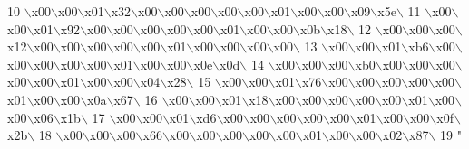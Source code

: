 \begin{DoxyCode}
10 \textcolor{stringliteral}{\(\backslash\)x00\(\backslash\)x00\(\backslash\)x01\(\backslash\)x32\(\backslash\)x00\(\backslash\)x00\(\backslash\)x00\(\backslash\)x00\(\backslash\)x00\(\backslash\)x01\(\backslash\)x00\(\backslash\)x00\(\backslash\)x09\(\backslash\)x5e\(\backslash\)}
11 \textcolor{stringliteral}{\(\backslash\)x00\(\backslash\)x00\(\backslash\)x01\(\backslash\)x92\(\backslash\)x00\(\backslash\)x00\(\backslash\)x00\(\backslash\)x00\(\backslash\)x00\(\backslash\)x01\(\backslash\)x00\(\backslash\)x00\(\backslash\)x0b\(\backslash\)x18\(\backslash\)}
12 \textcolor{stringliteral}{\(\backslash\)x00\(\backslash\)x00\(\backslash\)x00\(\backslash\)x12\(\backslash\)x00\(\backslash\)x00\(\backslash\)x00\(\backslash\)x00\(\backslash\)x00\(\backslash\)x01\(\backslash\)x00\(\backslash\)x00\(\backslash\)x00\(\backslash\)x00\(\backslash\)}
13 \textcolor{stringliteral}{\(\backslash\)x00\(\backslash\)x00\(\backslash\)x01\(\backslash\)xb6\(\backslash\)x00\(\backslash\)x00\(\backslash\)x00\(\backslash\)x00\(\backslash\)x00\(\backslash\)x01\(\backslash\)x00\(\backslash\)x00\(\backslash\)x0e\(\backslash\)x0d\(\backslash\)}
14 \textcolor{stringliteral}{\(\backslash\)x00\(\backslash\)x00\(\backslash\)x00\(\backslash\)xb0\(\backslash\)x00\(\backslash\)x00\(\backslash\)x00\(\backslash\)x00\(\backslash\)x00\(\backslash\)x01\(\backslash\)x00\(\backslash\)x00\(\backslash\)x04\(\backslash\)x28\(\backslash\)}
15 \textcolor{stringliteral}{\(\backslash\)x00\(\backslash\)x00\(\backslash\)x01\(\backslash\)x76\(\backslash\)x00\(\backslash\)x00\(\backslash\)x00\(\backslash\)x00\(\backslash\)x00\(\backslash\)x01\(\backslash\)x00\(\backslash\)x00\(\backslash\)x0a\(\backslash\)x67\(\backslash\)}
16 \textcolor{stringliteral}{\(\backslash\)x00\(\backslash\)x00\(\backslash\)x01\(\backslash\)x18\(\backslash\)x00\(\backslash\)x00\(\backslash\)x00\(\backslash\)x00\(\backslash\)x00\(\backslash\)x01\(\backslash\)x00\(\backslash\)x00\(\backslash\)x06\(\backslash\)x1b\(\backslash\)}
17 \textcolor{stringliteral}{\(\backslash\)x00\(\backslash\)x00\(\backslash\)x01\(\backslash\)xd6\(\backslash\)x00\(\backslash\)x00\(\backslash\)x00\(\backslash\)x00\(\backslash\)x00\(\backslash\)x01\(\backslash\)x00\(\backslash\)x00\(\backslash\)x0f\(\backslash\)x2b\(\backslash\)}
18 \textcolor{stringliteral}{\(\backslash\)x00\(\backslash\)x00\(\backslash\)x00\(\backslash\)x66\(\backslash\)x00\(\backslash\)x00\(\backslash\)x00\(\backslash\)x00\(\backslash\)x00\(\backslash\)x01\(\backslash\)x00\(\backslash\)x00\(\backslash\)x02\(\backslash\)x87\(\backslash\)}
19 \textcolor{stringliteral}{"}
\end{DoxyCode}
